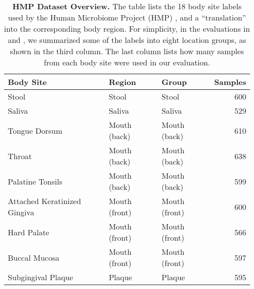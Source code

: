 \begin{table}[htbp]
\caption[HMP Dataset Overview]{
\textbf{HMP Dataset Overview.}
The table lists the \num{18} body site labels used by the Human Microbiome Project (HMP) \cite{Huttenhower2012,Methe2012},
and a ``translation'' into the corresponding body region.
For simplicity, in the evaluations in  and
,
we summarized some of the labels into eight location groups, as shown in the third column.
The last column lists how many samples from each body site were used in our evaluation.
}
\label{tab:hmp_data_overview}
{
    \begin{center}
    \begin{tabular}{lllr}
        \toprule
        Body Site                       & Region            & Group             & Samples   \\
        \midrule
        Stool                           & Stool             & Stool             & 600   \\
        Saliva                          & Saliva            & Saliva            & 529   \\
        Tongue Dorsum                   & Mouth (back)      & Mouth (back)      & 610   \\
        Throat                          & Mouth (back)      & Mouth (back)      & 638   \\
        Palatine Tonsils                & Mouth (back)      & Mouth (back)      & 599   \\
        Attached Keratinized Gingiva    & Mouth (front)     & Mouth (front)     & 600   \\
        Hard Palate                     & Mouth (front)     & Mouth (front)     & 566   \\
        Buccal Mucosa                   & Mouth (front)     & Mouth (front)     & 597   \\
        Subgingival Plaque              & Plaque            & Plaque            & 595   \\

\end{tabular}
\end{center}}
\end{table}
